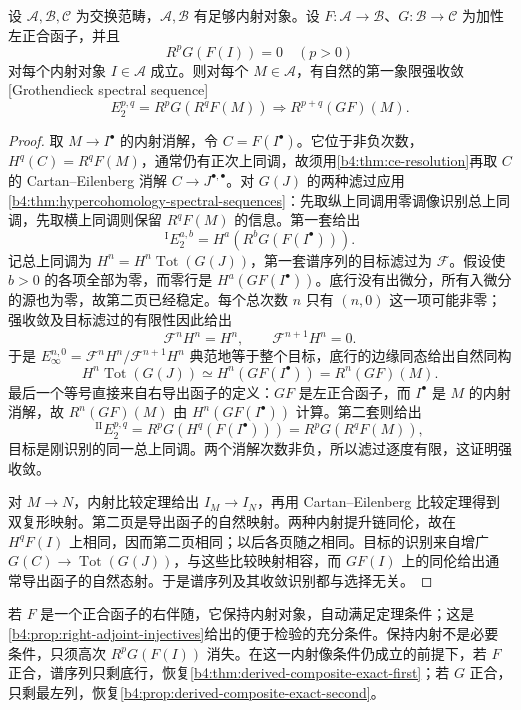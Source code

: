 \begin{theorem}\label{b4:thm:grothendieck-spectral-sequence}
	设 \(\mathcal A,\mathcal B,\mathcal C\) 为交换范畴，\(\mathcal A,\mathcal B\) 有足够内射对象。设 \(F:\mathcal A\to\mathcal B\)、\(G:\mathcal B\to\mathcal C\) 为加性左正合函子，并且
	\[
		R^pG(F(I))=0\quad(p>0)
	\]
	对每个内射对象 \(I\in\mathcal A\) 成立。则对每个 \(M\in\mathcal A\)，有自然的第一象限强收敛[Grothendieck spectral sequence]
	\[
		E_2^{p,q}=R^pG(R^qF(M))\Longrightarrow R^{p+q}(GF)(M).
	\]
\end{theorem}
\begin{proof}
	取 \(M\to I^\bullet\) 的内射消解，令 \(C=F(I^\bullet)\)。它位于非负次数，\(H^q(C)=R^qF(M)\)，通常仍有正次上同调，故须用\cref{b4:thm:ce-resolution}再取 \(C\) 的 Cartan--Eilenberg 消解 \(C\to J^{\bullet,\bullet}\)。对 \(G(J)\) 的两种滤过应用\cref{b4:thm:hypercohomology-spectral-sequences}：先取纵上同调用零调像识别总上同调，先取横上同调则保留 \(R^qF(M)\) 的信息。第一套给出
	\[
		{}^{\mathrm I}E_2^{a,b}=H^a(R^bG(F(I^\bullet))).
	\]
	记总上同调为 \(H^n=H^n\operatorname{Tot}(G(J))\)，第一套谱序列的目标滤过为 \(\mathcal F\)。假设使 \(b>0\) 的各项全部为零，而零行是 \(H^a(GF(I^\bullet))\)。底行没有出微分，所有入微分的源也为零，故第二页已经稳定。每个总次数 \(n\) 只有 \((n,0)\) 这一项可能非零；强收敛及目标滤过的有限性因此给出
	\[
		\mathcal F^nH^n=H^n,\qquad \mathcal F^{n+1}H^n=0.
	\]
	于是 \(E_\infty^{n,0}=\mathcal F^nH^n/\mathcal F^{n+1}H^n\) 典范地等于整个目标，底行的边缘同态给出自然同构
	\[
		H^n\operatorname{Tot}(G(J)) \simeq H^n(GF(I^\bullet))=R^n(GF)(M).
	\]
	最后一个等号直接来自右导出函子的定义：\(GF\) 是左正合函子，而 \(I^\bullet\) 是 \(M\) 的内射消解，故 \(R^n(GF)(M)\) 由 \(H^n(GF(I^\bullet))\) 计算。第二套则给出
	\[
		{}^{\mathrm {II}}E_2^{p,q}=R^pG(H^q(F(I^\bullet))) =R^pG(R^qF(M)),
	\]
	目标是刚识别的同一总上同调。两个消解次数非负，所以滤过逐度有限，这证明强收敛。

	对 \(M\to N\)，内射比较定理给出 \(I_M\to I_N\)，再用 Cartan--Eilenberg 比较定理得到双复形映射。第二页是导出函子的自然映射。两种内射提升链同伦，故在 \(H^qF(I)\) 上相同，因而第二页相同；以后各页随之相同。目标的识别来自增广 \(G(C)\to\operatorname{Tot}(G(J))\)，与这些比较映射相容，而 \(GF(I)\) 上的同伦给出通常导出函子的自然态射。于是谱序列及其收敛识别都与选择无关。
\end{proof}

若 \(F\) 是一个正合函子的右伴随，它保持内射对象，自动满足定理条件；这是\cref{b4:prop:right-adjoint-injectives}给出的便于检验的充分条件。保持内射不是必要条件，只须高次 \(R^pG(F(I))\) 消失。在这一内射像条件仍成立的前提下，若 \(F\) 正合，谱序列只剩底行，恢复\cref{b4:thm:derived-composite-exact-first}；若 \(G\) 正合，只剩最左列，恢复\cref{b4:prop:derived-composite-exact-second}。

